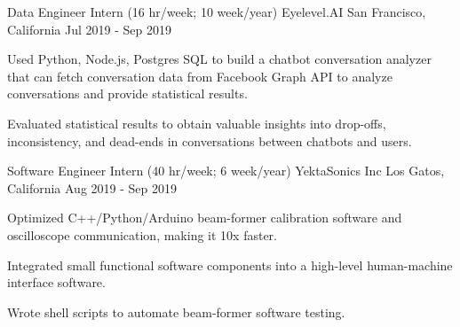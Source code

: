 

\begin{cventries}

  \cventry
    {Data Engineer Intern (16 hr/week; 10 week/year) } %
    {Eyelevel.AI} %
    {San Francisco, California} %
    {Jul 2019 - Sep 2019} %
    {
	\begin{cvitems} %
      	\item Used Python, Node.js, Postgres SQL to build a chatbot conversation analyzer that can fetch conversation data from Facebook Graph API to analyze conversations and provide statistical results.
      	\item Evaluated statistical results to obtain valuable insights into drop-offs, inconsistency, and dead-ends in conversations between chatbots and users.
	\end{cvitems}
    }
    
  \cventry
    {Software Engineer Intern (40 hr/week; 6 week/year) } %
    {YektaSonics Inc} %
    {Los Gatos, California} %
    {Aug 2019 - Sep 2019} %
    {
	\begin{cvitems} %
      	\item Optimized C++/Python/Arduino beam-former calibration software and oscilloscope communication, making it 10x faster.
      	\item Integrated small functional software components into a high-level human-machine interface software. 
      	\item Wrote shell scripts to automate beam-former software testing.
	\end{cvitems}
    }
    

\end{cventries}
